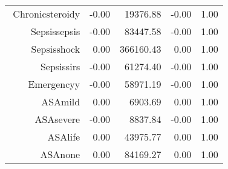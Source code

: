 \begin{tabular}{rrrrr}
$$  Chronic\-steroid\-y & -0.00 & 19376.88 & -0.00 & 1.00 \\ 
  Sepsis\-sepsis & -0.00 & 83447.58 & -0.00 & 1.00 \\ 
  Sepsis\-shock & 0.00 & 366160.43 & 0.00 & 1.00 \\ 
  Sepsis\-sirs & -0.00 & 61274.40 & -0.00 & 1.00 \\ 
  Emergency\-y & -0.00 & 58971.19 & -0.00 & 1.00 \\ 
  ASA\-mild & 0.00 & 6903.69 & 0.00 & 1.00 \\ 
  ASA\-severe & -0.00 & 8837.84 & -0.00 & 1.00 \\ 
  ASA\-life & 0.00 & 43975.77 & 0.00 & 1.00 \\ 
  ASA\-none & 0.00 & 84169.27 & 0.00 & 1.00 \\ 
   \hline
\end{tabular}

